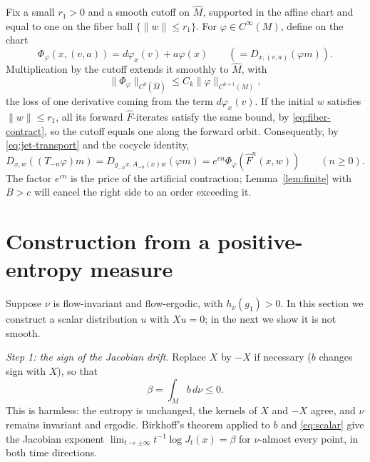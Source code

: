 \documentclass[11pt]{article}
\theoremstyle{remark}
\begin{document}
Fix a small \(r_1>0\) and a smooth cutoff on \(\widehat M\),
supported in the affine chart and equal to one on the fiber ball
\(\{\|w\|\le r_1\}\).  For \(\varphi\in C^\infty(M)\), define on the
chart
\[
 \Phi_\varphi(x,(v,a))=d\varphi_x(v)+a\varphi(x)
 \qquad(=D_{x,(v,a)}(\varphi m)).
\]
Multiplication by the cutoff extends it smoothly to \(\widehat M\),
with
\begin{equation}\label{eq:observable-norm}
 \|\Phi_\varphi\|_{C^k(\widehat M)}
                  \le C_k\|\varphi\|_{C^{k+1}(M)},
\end{equation}
the loss of one derivative coming from the term \(d\varphi_x(v)\).
If the initial \(w\) satisfies \(\|w\|\le r_1\), all its forward
\(\widehat F\)-iterates satisfy the same bound, by
\eqref{eq:fiber-contract}, so the cutoff equals one along the forward
orbit.  Consequently, by \eqref{eq:jet-transport}
and the cocycle identity,
\begin{equation}\label{eq:recover-jet}
 D_{x,w}((T_{-n}\varphi)m)
      =D_{g_{-n}x,A_{-n}(x)w}(\varphi m)
      =e^{cn}\Phi_\varphi(\widehat F^n(x,w))\qquad(n\ge0).
\end{equation}
The factor \(e^{cn}\) is the price of the artificial contraction;
Lemma~\ref{lem:finite} with \(B>c\) will cancel the right side to an
order exceeding it.

\section{Construction from a positive-entropy measure}
\label{sec:construction}

Suppose \(\nu\) is flow-invariant and flow-ergodic, with
\(h_\nu(g_1)>0\).  In this section we construct a scalar distribution
\(u\) with \(Xu=0\); in the next we show it is not smooth.

\emph{Step 1: the sign of the Jacobian drift.}
Replace \(X\) by \(-X\) if necessary (\(b\) changes sign with
\(X\)), so that
\begin{equation}\label{eq:beta}
 \beta=\int_M b\,d\nu\le0.
\end{equation}
This is harmless: the entropy is unchanged, the kernels of \(X\) and
\(-X\) agree, and \(\nu\) remains invariant and ergodic.
Birkhoff's theorem applied to \(b\) and \eqref{eq:scalar} give the
Jacobian exponent \(\lim_{t\to\pm\infty}t^{-1}\log J_t(x)=\beta\) for
\(\nu\)-almost every point, in both time directions.
\end{document}
